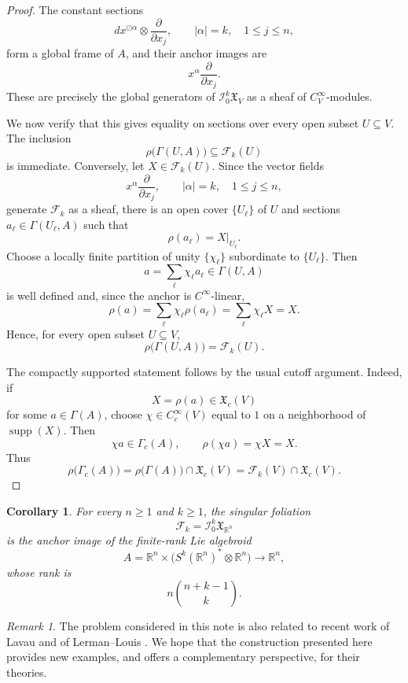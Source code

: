 \documentclass[12pt,reqno]{amsart}
\newtheorem{cor}[thm]{Corollary}
\theoremstyle{definition}
\theoremstyle{remark}
\newtheorem{remark}[thm]{Remark}
\newcommand{\R}{\mathbb{R}}
\begin{document}
\begin{proof}
The constant sections
\[
dx^{\odot\alpha}\otimes \frac{\partial}{\partial x_j},
\qquad
|\alpha|=k,\quad 1\leq j\leq n,
\]
form a global frame of \(A\), and their anchor images are
\[
x^\alpha\frac{\partial}{\partial x_j}.
\]
These are precisely the global generators of
\(\mathcal I_0^k\mathfrak X_V\) as a sheaf of
\(C^\infty_V\)-modules.

We now verify that this gives equality on sections over every
open subset \(U\subseteq V\). The inclusion
\[
\rho\bigl(\Gamma(U,A)\bigr)\subseteq \mathcal F_k(U)
\]
is immediate. Conversely, let \(X\in\mathcal F_k(U)\). Since the vector
fields
\[
x^\alpha\frac{\partial}{\partial x_j},
\qquad
|\alpha|=k,\quad 1\leq j\leq n,
\]
generate \(\mathcal F_k\) as a sheaf, there is an open cover
\(\{U_\ell\}\) of \(U\) and sections
\(a_\ell\in\Gamma(U_\ell,A)\) such that
\[
\rho(a_\ell)=X|_{U_\ell}.
\]
Choose a locally finite partition of unity
\(\{\chi_\ell\}\) subordinate to \(\{U_\ell\}\). Then
\[
a=\sum_\ell \chi_\ell a_\ell\in\Gamma(U,A)
\]
is well defined and, since the anchor is \(C^\infty\)-linear,
\[
\rho(a)
=
\sum_\ell \chi_\ell\rho(a_\ell)
=
\sum_\ell \chi_\ell X
=
X.
\]
Hence, for every open subset \(U\subseteq V\),
\[
\rho\bigl(\Gamma(U,A)\bigr)=\mathcal F_k(U).
\]

The compactly supported statement follows by the usual cutoff argument.
Indeed, if
\[
X=\rho(a)\in\mathfrak X_c(V)
\]
for some \(a\in\Gamma(A)\), choose
\(\chi\in C^\infty_c(V)\) equal to \(1\) on a neighborhood of
\(\operatorname{supp}(X)\). Then
\[
\chi a\in\Gamma_c(A),
\qquad
\rho(\chi a)=\chi X=X.
\]
Thus
\[
\rho\bigl(\Gamma_c(A)\bigr)
=
\rho\bigl(\Gamma(A)\bigr)\cap\mathfrak X_c(V)
=
\mathcal F_k(V)\cap\mathfrak X_c(V).
\]
\end{proof}


\begin{cor}
For every \(n\geq1\) and \(k\geq1\), the singular foliation
\[
\mathcal F_k
=
\mathcal I_0^k\mathfrak X_{\R^n}
\]
is the anchor image of the finite-rank Lie algebroid
\[
A
=
\R^n\times
\bigl(S^k(\R^n)^*\otimes\R^n\bigr)
\longrightarrow\R^n,
\]
whose rank is
\[
n\binom{n+k-1}{k}.
\]
\end{cor}

\begin{remark}
The problem considered in this note is also related to recent work
of Lavau \cite{L} and of Lerman--Louis \cite{LL}. We hope that the construction presented
here provides new examples, and offers a complementary perspective, for their theories.
\end{remark}    
\end{document}
